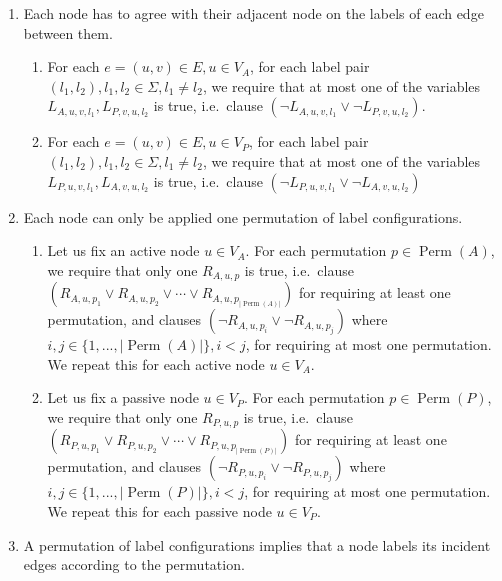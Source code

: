 \begin{enumerate}
\item
  Each node has to agree with their adjacent node on the labels of each edge between them.
  \begin{enumerate}
  \item
    For each $e=(u, v)\in E, u\in V_A$, for each label pair $(l_1, l_2), l_1, l_2 \in \Sigma, l_1 \neq l_2$, we require that at most one of the variables $L_{A,u,v,l_1}, L_{P,v,u,l_2}$ is true, i.e.\ clause $(\neg L_{A,u,v,l_1} \lor \neg L_{P,v,u,l_2})$.
    \label{enu:sat_conditions:1a}
  \item
    For each $e=(u, v)\in E, u\in V_P$, for each label pair $(l_1, l_2), l_1, l_2 \in \Sigma, l_1 \neq l_2$, we require that at most one of the variables $L_{P,u,v,l_1}, L_{A,v,u,l_2}$ is true, i.e.\ clause $(\neg L_{P,u,v,l_1} \lor \neg L_{A,v,u,l_2})$
    \label{enu:sat_conditions:1b}
  \end{enumerate}
\item
  Each node can only be applied one permutation of label configurations.
  \begin{enumerate}
  \item
    Let us fix an active node $u \in V_A$.
    For each permutation $p \in \operatorname{Perm}(A)$, we require that only one $R_{A, u, p}$ is true, i.e.\ clause $(R_{A, u, p_1} \lor R_{A, u, p_2} \lor \dotsm \lor R_{A, u, p_{|\operatorname{Perm}(A)|}})$ for requiring at least one permutation,
    and clauses
    $ (\neg R_{A, u, p_i} \lor \neg R_{A, u, p_j})$ where $i, j \in \{1, ..., |\operatorname{Perm}(A)|\}, i < j$,
    for requiring at most one permutation.
    We repeat this for each active node $u \in V_A$.
    \label{enu:sat_conditions:2a}
  \item
    Let us fix a passive node $u \in V_P$.
    For each permutation $p \in \operatorname{Perm}(P)$, we require that only one $R_{P, u, p}$ is true, i.e.\ clause $(R_{P, u, p_1} \lor R_{P, u, p_2} \lor \dotsm \lor R_{P, u, p_{|\operatorname{Perm}(P)|}})$ for requiring at least one permutation,
    and clauses
    $ (\neg R_{P, u, p_i} \lor \neg R_{P, u, p_j})$ where $i, j \in \{1, ..., |\operatorname{Perm}(P)|\}, i < j$,
    for requiring at most one permutation.
    We repeat this for each passive node $u \in V_P$.
    \label{enu:sat_conditions:2b}
  \end{enumerate}
\item
  A permutation of label configurations implies that a node labels its incident edges according to the permutation.
  \begin{enumerate}

\end{enumerate}
\end{enumerate}
